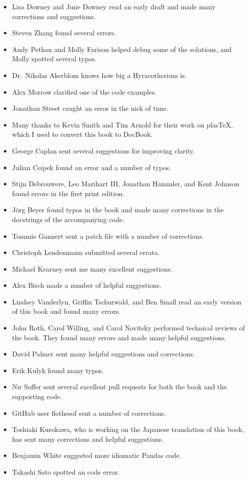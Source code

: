 \documentclass[]{book}
\providecommand{\tightlist}{%
  \setlength{\itemsep}{0pt}\setlength{\parskip}{0pt}}
\begin{document}
\begin{itemize}
\tightlist
\item
  Lisa Downey and June Downey read an
  early draft and made many corrections and suggestions.
\item
  Steven Zhang found several
  errors.
\item
  Andy Pethan and Molly Farison helped
  debug some of the solutions, and Molly spotted several typos.
\item
  Dr.~Nikolas Akerblom knows how big a
  Hyracotherium is.
\item
  Alex Morrow clarified one of the code
  examples.
\item
  Jonathan Street caught an error in the
  nick of time.
\item
  Many thanks to Kevin Smith and Tim
  Arnold for their work on plasTeX, which I used to convert this book
  to DocBook.
\item
  George Caplan sent several suggestions
  for improving clarity.
\item
  Julian Ceipek found an error and a
  number of typos.
\item
  Stijn Debrouwere, Leo Marihart III,
  Jonathan Hammler, and Kent Johnson found errors in the first print
  edition.
\item
  Jörg Beyer found typos in the book and
  made many corrections in the docstrings of the accompanying
  code.
\item
  Tommie Gannert sent a patch file with
  a number of corrections.
\item
  Christoph Lendenmann submitted several
  errata.
\item
  Michael Kearney sent me many excellent
  suggestions.
\item
  Alex Birch made a number of helpful
  suggestions.
\item
  Lindsey Vanderlyn, Griffin Tschurwald,
  and Ben Small read an early version of this book and found many
  errors.
\item
  John Roth, Carol Willing, and Carol
  Novitsky performed technical reviews of the book. They found many
  errors and made many helpful suggestions.
\item
  David Palmer sent many helpful
  suggestions and corrections.
\item
  Erik Kulyk found many typos.
\item
  Nir Soffer sent several excellent pull
  requests for both the book and the supporting code.
\item
  GitHub user flothesof sent a number of
  corrections.
\item
  Toshiaki Kurokawa, who is working on
  the Japanese translation of this book, has sent many corrections and
  helpful suggestions.
\item
  Benjamin White suggested more
  idiomatic Pandas code.
\item
  Takashi Sato spotted an code
  error.
\end{itemize}
\end{document}
